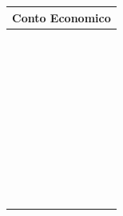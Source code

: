 \documentclass{article}
\begin{document}
\begin{longtable}{|m{10cm}|m{2cm}|}
    \hline
    \multicolumn{2}{|c|}{\textbf{Conto Economico}}
    \\ %
    \hline
     & \\
    \hline
     & \\
    \hline
     & \\
    \hline
     & \\
    \hline
     & \\
    \hline
     & \\
    \hline
     & \\
    \hline
     & \\
    \hline
     & \\
    \hline
     & \\
    \hline
     & \\
    \hline
     & \\
    \hline
     & \\
    \hline
     & \\
    \hline
     & \\
    \hline
     & \\
    \hline
     & \\
    \hline
     & \\
    \hline
     & \\
    \hline
     & \\
    \hline
     & \\
    \hline
     & \\
    \hline
     & \\
    \hline
     & \\
    \hline
     & \\
    \hline
     & \\
    \hline
     & \\
    \hline
     & \\
    \hline
     & \\
    \hline
     & \\
    \hline
     & \\
    \hline
     & \\
    \hline
     & \\
    \hline
     & \\
    \hline
     & \\
    \hline
     & \\
    \hline
     & \\
    \hline
     & \\
    \hline
     & \\
    \hline
     & \\
    \hline
     & \\
    \hline
     & \\
    \hline
     & \\
    \hline
\end{longtable}
\label{tab:Conto Economico}
\end{document}
